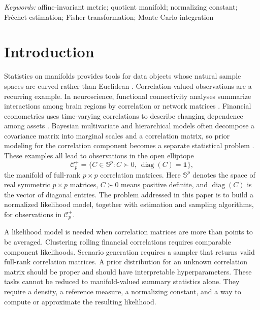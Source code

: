 \documentclass[
  12pt]{article}
\newcommand{\Frechet}{Fr\'{e}chet\xspace}
\newcommand{\Sym}{\mathbb S}
\newcommand{\Corr}{\mathcal C^+}
\newcommand{\diag}{\operatorname{diag}}
\begin{document}
\noindent%
{\it Keywords:} 
affine-invariant metric; quotient manifold; normalizing constant; \Frechet  estimation; Fisher transformation; Monte Carlo integration
\vfill

\newpage
{} %



\section{Introduction}

Statistics on manifolds provides tools for data objects whose natural sample spaces are curved rather than Euclidean \citep{karcher_1977_RiemannianCenterMass,bhattacharya_2012_NonparametricInferenceManifolds,pennec_2020_RiemannianGeometricStatistics}. Correlation-valued observations are a recurring example. In neuroscience, functional connectivity analyses summarize interactions among brain regions by correlation or network matrices \citep{park_2013_StructuralFunctionalBrain,craddock_2015_ConnectomicsNewApproaches}. Financial econometrics uses time-varying correlations to describe changing dependence among assets \citep{engle_2002_DynamicConditionalCorrelation}. Bayesian multivariate and hierarchical models often decompose a covariance matrix into marginal scales and a correlation matrix, so prior modeling for the correlation component becomes a separate statistical problem \citep{barnard_2000_ModelingCovarianceMatrices,lewandowski_2009_GeneratingRandomCorrelation}. These examples all lead to observations in the open elliptope
\[
\Corr_p=\{C\in \Sym^p:C\succ0,\ \diag(C)=\mathbf 1\},
\]
the manifold of full-rank $p\times p$ correlation matrices. Here $\Sym^p$ denotes the space of real symmetric $p\times p$ matrices, $C\succ0$ means positive definite, and $\diag(C)$ is the vector of diagonal entries. The problem addressed in this paper is to build a normalized likelihood model, together with estimation and sampling algorithms, for observations in $\Corr_p$.

A likelihood model is needed when correlation matrices are more than points to be averaged. Clustering rolling financial correlations requires comparable component likelihoods. Scenario generation requires a sampler that returns valid full-rank correlation matrices. A prior distribution for an unknown correlation matrix should be proper and should have interpretable hyperparameters. These tasks cannot be reduced to manifold-valued summary statistics alone. They require a density, a reference measure, a normalizing constant, and a way to compute or approximate the resulting likelihood.
\end{document}
